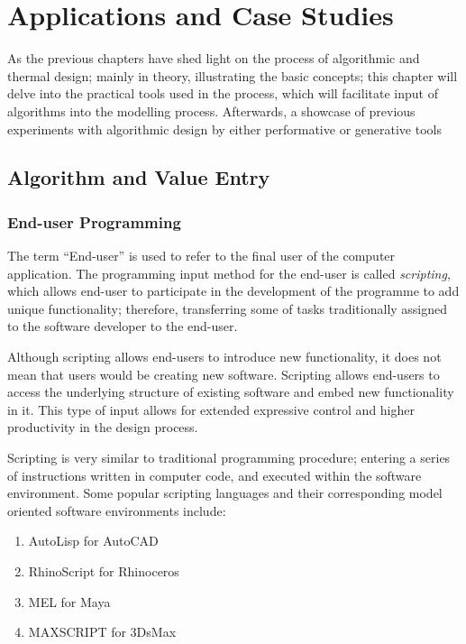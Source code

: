 \chapter{Applications and Case Studies}

As the previous chapters have shed light on the process of algorithmic and thermal design; mainly in theory, illustrating the basic concepts; this chapter will delve into the practical tools used in the process, which will facilitate input of algorithms into the modelling process. Afterwards, a showcase of previous experiments with algorithmic design by either performative or generative tools

\section{Algorithm and Value Entry}

\subsection{End-user Programming}

The term ``End-user'' is used to refer to the final user of the computer application. The programming input method for the end-user is called \emph{scripting}, which allows end-user to participate in the development of the programme to add unique functionality; therefore, transferring some of tasks traditionally assigned to the software developer to the end-user.

Although scripting allows end-users to introduce new functionality, it does not mean that users would be creating new software. Scripting allows end-users to access the underlying structure of existing software and embed new functionality in it. This type of input allows for extended expressive control and higher productivity in the design process. \cite{kashyap01}

Scripting is very similar to traditional programming procedure; entering a series of instructions written in computer code, and executed within the software environment. Some popular scripting languages and their corresponding model oriented software environments include: 

\begin{enumerate}
\item AutoLisp for AutoCAD
\item RhinoScript for Rhinoceros
\item MEL for Maya
\item MAXSCRIPT for 3DsMax
\end{enumerate}

